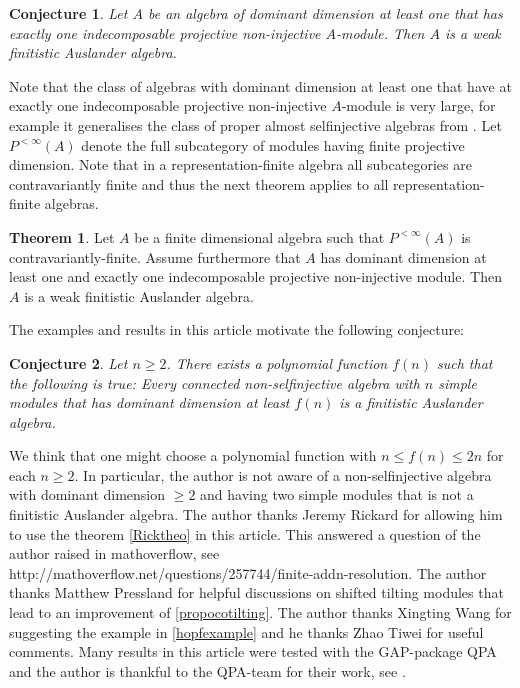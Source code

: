 \documentclass[a4paper]{amsart}
\newtheorem*{conjecture}{Conjecture}
\theoremstyle{definition}
\newtheorem*{theorem*}{Theorem}
\theoremstyle{remark}
\numberwithin{equation}{theorem}
\begin{document}
\begin{conjecture}
Let $A$ be an algebra of dominant dimension at least one that has exactly one indecomposable projective non-injective $A$-module. Then $A$ is a weak finitistic Auslander algebra.
\end{conjecture}
Note that the class of algebras with dominant dimension at least one that have at exactly one indecomposable projective non-injective $A$-module is very large, for example it generalises the class of proper almost selfinjective algebras from \cite{FHK}.
Let $P^{< \infty}(A)$ denote the full subcategory of modules having finite projective dimension. Note that in a representation-finite algebra all subcategories are contravariantly finite and thus the next theorem applies to all representation-finite algebras.
\begin{theorem*}
Let $A$ be a finite dimensional algebra such that $P^{< \infty}(A)$ is contravariantly-finite. Assume furthermore that $A$ has dominant dimension at least one and exactly one indecomposable projective non-injective module. Then $A$ is a weak finitistic Auslander algebra.

\end{theorem*}


The examples and results in this article motivate the following conjecture:
\begin{conjecture}
Let $n \geq 2$.
There exists a polynomial function $f(n)$ such that the following is true: \newline
Every connected non-selfinjective algebra with $n$ simple modules that has dominant dimension at least $f(n)$ is a finitistic Auslander algebra.
\end{conjecture}
We think that one might choose a polynomial function with $n \leq f(n) \leq 2n$ for each $n \geq 2$. In particular, the author is not aware of a non-selfinjective algebra with dominant dimension $\geq 2$ and having two simple modules that is not a finitistic Auslander algebra.
The author thanks Jeremy Rickard for allowing him to use the theorem \ref{Ricktheo} in this article. This answered a question of the author raised in mathoverflow, see http://mathoverflow.net/questions/257744/finite-addn-resolution. The author thanks Matthew Pressland for helpful discussions on shifted tilting modules that lead to an improvement of \ref{propocotilting}. The author thanks Xingting Wang for suggesting the example in \ref{hopfexample} and he thanks Zhao Tiwei for useful comments.
Many results in this article were tested with the GAP-package QPA and the author is thankful to the QPA-team for their work, see \cite{QPA}.
\end{document}
